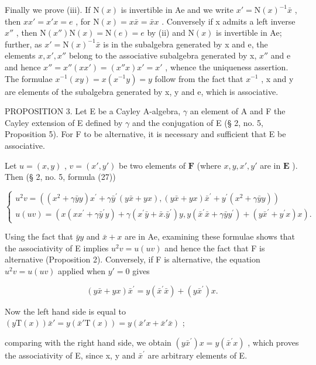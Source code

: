 Finally we prove (iii). If \(\mathrm{N}(x)\) is invertible in Ae and we write \(x' = \mathrm{N}(x)^{-1}\bar{x}\) , then \(xx' = x'x = e\) , for \(\mathrm{N}(x) = x\bar{x} = \bar{x}x\) . Conversely if x admits a left inverse \(x''\) , then \(\mathrm{N}(x'')\mathrm{N}(x) = \mathrm{N}(e) = e\) by (ii) and \(\mathrm{N}(x)\) is invertible in Ae; further, as \(x' = \mathrm{N}(x)^{-1}\bar{x}\) is in the subalgebra generated by x and e, the elements \(x, x', x''\) belong to the associative subalgebra generated by x, \(x''\) and e and hence \(x'' = x''(xx') = (x''x)x' = x'\) , whence the uniqueness assertion. The formulae \(x^{-1}(xy) = x(x^{-1}y) = y\) follow from the fact that \(x^{-1}\) , x and y are elements of the subalgebra generated by x, y and e, which is associative.

PROPOSITION 3. Let E be a Cayley A-algebra, \(\gamma\) an element of A and F the Cayley extension of E defined by \(\gamma\) and the conjugation of E (§ 2, no. 5, Proposition 5). For F to be alternative, it is necessary and sufficient that E be associative.

Let \(u = (x, y)\) , \(v = (x', y')\) be two elements of \(\mathbf{F}\) (where \(x, y, x', y'\) are in \(\mathbf{E}\) ). Then (§ 2, no. 5, formula (27))

\[
\left\{ \begin{array}{l} u ^ {2} v = ((x ^ {2} + \gamma \bar {y} y) x ^ {\prime} + \gamma \bar {y} ^ {\prime} (y \bar {x} + y x), (y \bar {x} + y x) \bar {x} ^ {\prime} + y ^ {\prime} (x ^ {2} + \gamma \bar {y} y)) \\ u (u v) = (x (x x ^ {\prime} + \gamma \bar {y} ^ {\prime} y) + \gamma (x ^ {\prime} \bar {y} + \bar {x}. \bar {y} ^ {\prime}) y, y (\bar {x} ^ {\prime} \bar {x} + \gamma \bar {y} y ^ {\prime}) + (y \bar {x} ^ {\prime} + y ^ {\prime} x) x). \end{array} \right.\tag{3}
\]

Using the fact that \(\bar{y}y\) and \(\bar{x} + x\) are in Ae, examining these formulae shows that the associativity of E implies \(u^{2}v = u(uv)\) and hence the fact that F is alternative (Proposition 2). Conversely, if F is alternative, the equation \(u^{2}v = u(uv)\) applied when \(y' = 0\) gives

\[
(y \bar {x} + y x) \bar {x} ^ {\prime} = y (\bar {x} ^ {\prime} \bar {x}) + (y \bar {x} ^ {\prime}) x.
\]

Now the left hand side is equal to \((y\mathrm{T}(x))\bar{x}' = y(\bar{x}'\mathrm{T}(x)) = y(\bar{x}'x + \bar{x}'\bar{x})\) ;

comparing with the right hand side, we obtain \((y\bar{x}^{\prime})x = y(\bar{x}^{\prime}x)\) , which proves the associativity of E, since x, y and \(\bar{x}^{\prime}\) are arbitrary elements of E.

